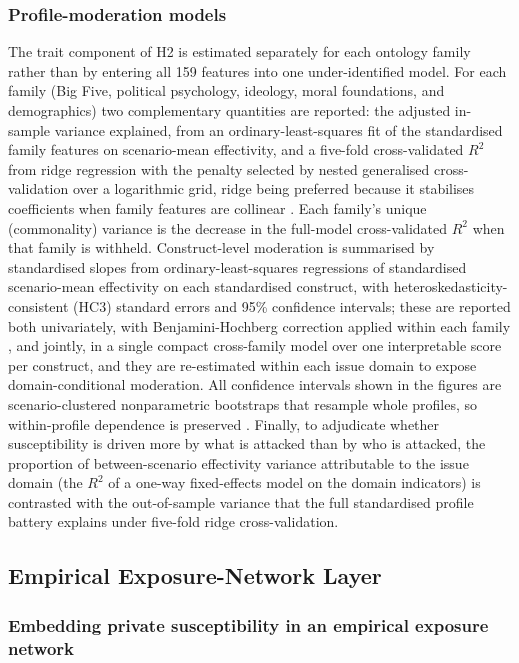 \documentclass[11pt,a4paper]{article}
\begin{document}
\subsubsection{Profile-moderation models}

The trait component of H2 is estimated separately for each ontology family rather than by entering
all 159 features into one under-identified model. For each family (Big Five, political psychology,
ideology, moral foundations, and demographics) two complementary quantities are reported: the
adjusted in-sample variance explained, from an ordinary-least-squares fit of the standardised
family features on scenario-mean effectivity, and a five-fold cross-validated $R^2$ from ridge
regression with the penalty selected by nested generalised cross-validation over a logarithmic
grid, ridge being preferred because it stabilises coefficients when family features are collinear
\citep{hoerl1970ridge}. Each family's unique (commonality) variance is the decrease in the
full-model cross-validated $R^2$ when that family is withheld. Construct-level moderation is
summarised by standardised slopes from ordinary-least-squares regressions of standardised
scenario-mean effectivity on each standardised construct, with heteroskedasticity-consistent
(HC3) standard errors and 95\% confidence intervals; these are reported both univariately, with
Benjamini-Hochberg correction applied within each family \citep{benjamini1995controlling}, and
jointly, in a single compact cross-family model over one interpretable score per construct, and
they are re-estimated within each issue domain to expose domain-conditional moderation. All
confidence intervals shown in the figures are scenario-clustered nonparametric bootstraps that
resample whole profiles, so within-profile dependence is preserved \citep{cameron2008bootstrap}.
Finally, to adjudicate whether susceptibility is driven more by what is attacked than by who is
attacked, the proportion of between-scenario effectivity variance attributable to the issue domain
(the $R^2$ of a one-way fixed-effects model on the domain indicators) is contrasted with the
out-of-sample variance that the full standardised profile battery explains under five-fold ridge
cross-validation.

\subsection{Empirical Exposure-Network Layer}\label{sec:network-method}

\subsubsection{Embedding private susceptibility in an empirical exposure network}
\end{document}
